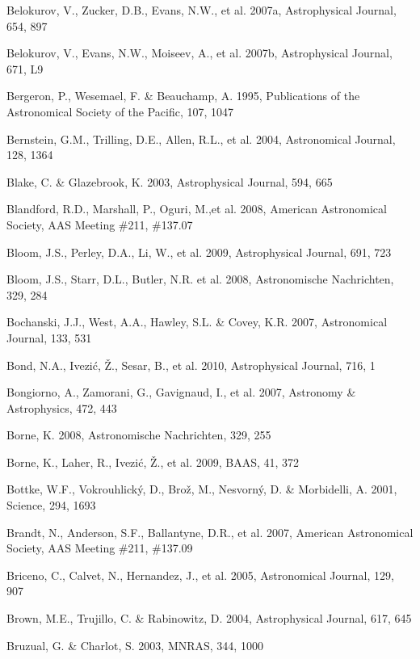 \documentclass{emulateapj}
\begin{document}
\begin{thebibliography}{}
\bibitem[()]{} Belokurov, V., Zucker, D.B., Evans, N.W., et al. 2007a, Astrophysical Journal, 654, 897

\bibitem[()]{} Belokurov, V., Evans, N.W., Moiseev, A., et al. 2007b, Astrophysical Journal, 671, L9

\bibitem[()]{} Bergeron, P., Wesemael, F. \& Beauchamp, A. 1995, Publications of the Astronomical Society
                   of the Pacific, 107, 1047

\bibitem[()]{} Bernstein, G.M., Trilling, D.E., Allen, R.L., et al. 2004, Astronomical Journal, 128, 1364

\bibitem[()]{} Blake, C. \& Glazebrook, K. 2003, Astrophysical Journal, 594, 665

\bibitem[()]{} Blandford, R.D., Marshall, P., Oguri, M.,et al. 2008, 
                           American Astronomical Society, AAS Meeting \#211, \#137.07
	
\bibitem[()]{} Bloom, J.S., Perley, D.A., Li, W., et al. 2009, Astrophysical Journal, 691, 723

\bibitem[()]{} Bloom, J.S., Starr, D.L., Butler, N.R. et al. 2008, Astronomische Nachrichten, 329, 284

\bibitem[()]{} Bochanski, J.J., West, A.A., Hawley, S.L. \& Covey, K.R. 2007, Astronomical Journal, 133, 531

\bibitem[()]{} Bond, N.A.,  Ivezi\'{c}, \v{Z}., Sesar, B., et al. 2010, Astrophysical Journal, 716, 1

\bibitem[()]{} Bongiorno, A., Zamorani, G., Gavignaud, I., et al. 2007, Astronomy \& Astrophysics, 472, 443 

\bibitem[()]{} Borne, K. 2008, Astronomische Nachrichten, 329, 255

\bibitem[()]{} Borne, K., Laher, R., Ivezi\'{c}, \v{Z}., et al. 2009, BAAS, 41, 372

\bibitem[()]{} Bottke, W.F., Vokrouhlick\'{y}, D., Bro\v{z}, M., Nesvorn\'y, D. \& Morbidelli, A. 2001, 
             Science, 294, 1693

\bibitem[()]{} Brandt, N., Anderson, S.F., Ballantyne, D.R., et al. 2007, American Astronomical 
             Society, AAS Meeting \#211, \#137.09

\bibitem[()]{} Briceno, C., Calvet, N., Hernandez, J., et al. 2005, Astronomical Journal, 129, 907

\bibitem[()]{} Brown, M.E., Trujillo, C. \& Rabinowitz, D. 2004, Astrophysical Journal, 617, 645

\bibitem[()]{} Bruzual, G. \& Charlot, S. 2003, MNRAS, 344, 1000


\end{thebibliography}
\end{document}

